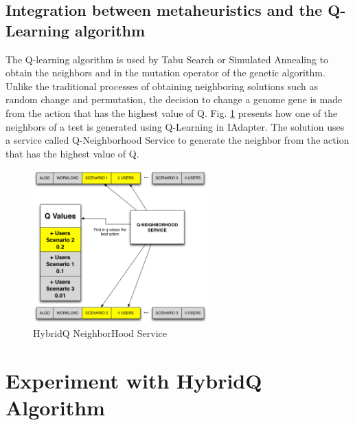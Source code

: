 \documentclass[espaco=umemeio,chapter=TITLE,twoside,openright]{abnt}
\begin{document}
\subsection{Integration between metaheuristics and the Q-Learning algorithm }

The Q-learning algorithm is used by Tabu Search or Simulated Annealing to obtain the neighbors and in the mutation operator of the genetic algorithm. Unlike the traditional processes of obtaining neighboring solutions such as random change and permutation, the decision to change a genome gene is made from the action that has the highest value of Q. Fig. \ref{fig:neighservice} presents how one of the neighbors of a test is generated using Q-Learning in IAdapter. The solution uses a service called Q-Neighborhood Service to generate the neighbor from the action that has the highest value of Q.

\begin{figure}[h!]
\center
\includegraphics[width=0.6\textwidth]{./images/q-neighborservice.png}
\caption{HybridQ NeighborHood Service}
\label{fig:neighservice}
\end{figure}

\section{Experiment with HybridQ Algorithm}
\end{document}
